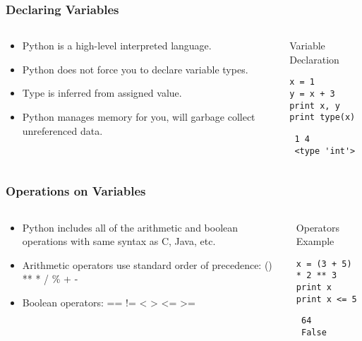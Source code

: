 \documentclass[bigger]{beamer}
\begin{document}
\begin{frame}[fragile]
\frametitle{Declaring Variables}
\label{sec-1-2}
\begin{columns}
\begin{column}{0.6\textwidth}
\label{sec-1-2-1}

\begin{itemize}
\item Python is a high-level interpreted language.
\item Python does not force you to declare variable types.
\item Type is inferred from assigned value.
\item Python manages memory for you, will garbage collect unreferenced data.
\end{itemize}
\end{column}
\begin{column}{0.4\textwidth}
\begin{block}{Variable Declaration}
\label{sec-1-2-2}


\begin{verbatim}
x = 1
y = x + 3
print x, y
print type(x)
\end{verbatim}

\begin{verbatim}
 1 4
 <type 'int'>
\end{verbatim}
\end{block}
\end{column}
\end{columns}
\end{frame}
\begin{frame}[fragile]
\frametitle{Operations on Variables}
\label{sec-1-3}
\begin{columns}
\begin{column}{0.6\textwidth}
\label{sec-1-3-1}

\begin{itemize}
\item Python includes all of the arithmetic and boolean operations with same syntax as C, Java, etc.
\item Arithmetic operators use standard order of precedence: () ** * / \% + -
\item Boolean operators: == != < > <= >=
\end{itemize}
\end{column}
\begin{column}{0.4\textwidth}
\begin{block}{Operators Example}
\label{sec-1-3-2}


\begin{verbatim}
x = (3 + 5) * 2 ** 3
print x
print x <= 5
\end{verbatim}

\begin{verbatim}
 64
 False
\end{verbatim}
\end{block}
\end{column}
\end{columns}
\end{frame}
\end{document}
